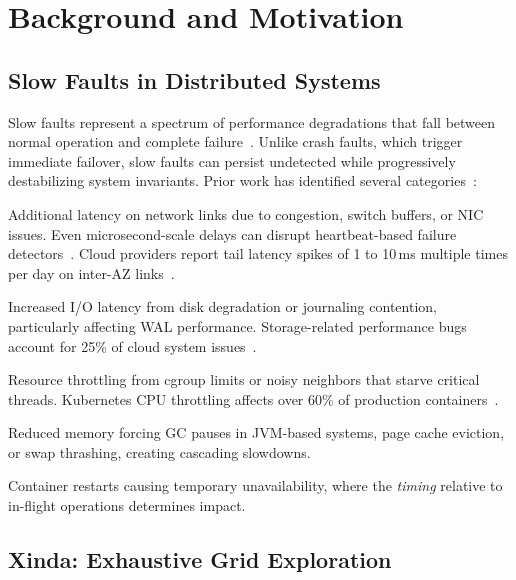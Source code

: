\section{Background and Motivation}
\label{sec:background}

\subsection{Slow Faults in Distributed Systems}

Slow faults represent a spectrum of performance degradations that fall between
normal operation and complete failure~\cite{huang-gray-failure}. Unlike crash
faults, which trigger immediate failover, slow faults can persist undetected
while progressively destabilizing system invariants. Prior work has identified
several categories~\cite{xinda,gunawi-cbs}:

 Additional latency on network links due to
congestion, switch buffers, or NIC issues. Even microsecond-scale delays can
disrupt heartbeat-based failure detectors~\cite{raft,zab}. Cloud providers
report tail latency spikes of 1 to 10\,ms multiple times per day on inter-AZ
links~\cite{dean-tail-latency}.

 Increased I/O latency from disk degradation or
journaling contention, particularly affecting WAL performance.
Storage-related performance bugs account for 25\% of cloud system
issues~\cite{lu-cloud-reliability}.

 Resource throttling from cgroup limits or noisy
neighbors that starve critical threads. Kubernetes CPU throttling affects
over 60\% of production containers~\cite{datadog-monitoring}.

 Reduced memory forcing GC pauses in JVM-based
systems, page cache eviction, or swap thrashing, creating cascading slowdowns.

 Container restarts causing temporary unavailability,
where the \emph{timing} relative to in-flight operations determines impact.

\subsection{Xinda: Exhaustive Grid Exploration}
\label{sec:xinda-background}

